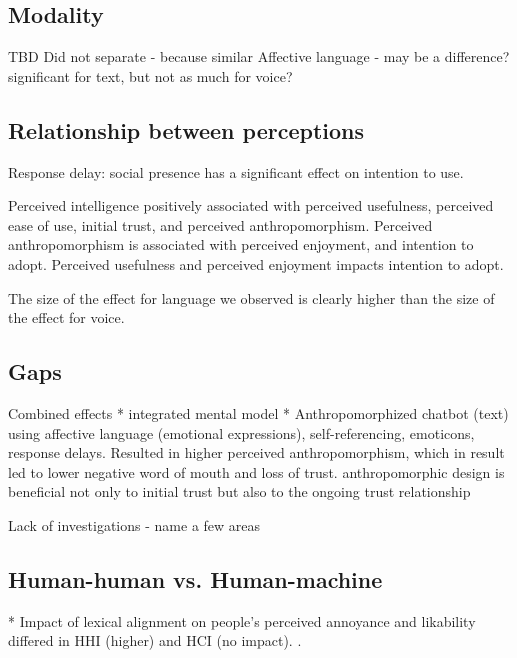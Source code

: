 \documentclass[sigconf,screen,review, anonymous]{acmart}
\newcommand{\cmt}[1]{}%
\begin{document}
\subsection{Modality}

TBD 
Did not separate - because similar 
Affective language - may be a difference? significant for text, but not as much for voice?

\subsection{Relationship between perceptions}

Response delay: social presence has a significant effect on intention to use. 
\cite{gnewuch2022opposing}\cmt{[20]}

Perceived intelligence positively associated with perceived usefulness, perceived ease of use, initial trust, and perceived anthropomorphism. Perceived anthropomorphism is associated with perceived enjoyment, and intention to adopt. Perceived usefulness and perceived enjoyment impacts intention to adopt. \cite{moussawi2021perceptions}\cmt{[36]}

The size of the effect for language we observed is clearly higher than the size of the effect for voice. \cite{habler2019effects}\cmt{[63]}

\subsection{Gaps}

Combined effects
* integrated mental model \cite{knijnenburg2016inferring}\cmt{[34]}
* Anthropomorphized chatbot (text) using affective language (emotional expressions), self-referencing, emoticons, response delays. Resulted in higher perceived anthropomorphism, which in result led to lower negative word of mouth and loss of trust. anthropomorphic design is beneficial not only to initial trust but also to the ongoing trust relationship \cite{seeger2021chatbots}\cmt{[35]}

Lack of investigations - name a few areas

\subsection{Human-human vs. Human-machine}

* Impact of lexical alignment on people's perceived annoyance and likability differed in HHI (higher) and HCI (no impact). \cite{huiyang2022improving}\cmt{[17]}.
\end{document}
